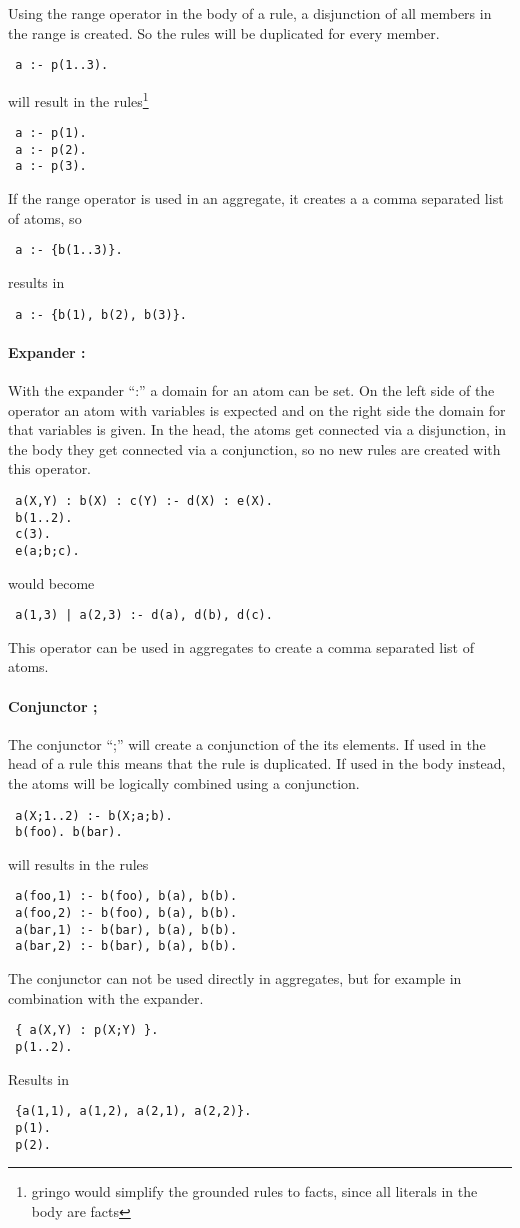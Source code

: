 \documentclass[a4paper,10pt]{article}
\begin{document}
Using the range operator in the body of a rule, a disjunction of all members in the range is created. So the rules will be duplicated for every member.
\begin{verbatim}
 a :- p(1..3).
\end{verbatim}
will result in the rules\footnote{gringo would simplify the grounded rules to facts, since all literals in the body are facts}
\begin{verbatim}
 a :- p(1).
 a :- p(2).
 a :- p(3).
\end{verbatim}
If the range operator is used in an aggregate, it creates a a comma separated list of atoms, so
\begin{verbatim}
 a :- {b(1..3)}.
\end{verbatim}
results in
\begin{verbatim}
 a :- {b(1), b(2), b(3)}.
\end{verbatim}

\paragraph{Expander :}
With the expander ``:'' a domain for an atom can be set.
On the left side of the operator an atom with variables is expected and on the right side the domain for that variables is given.
In the head, the atoms get connected via a disjunction, in the body they get connected via a conjunction, so no new rules are created with this operator.
\begin{verbatim}
 a(X,Y) : b(X) : c(Y) :- d(X) : e(X).
 b(1..2).
 c(3).
 e(a;b;c).
\end{verbatim}
would become
\begin{verbatim}
 a(1,3) | a(2,3) :- d(a), d(b), d(c).
\end{verbatim}
This operator can be used in aggregates to create a comma separated list of atoms.

\paragraph{Conjunctor ;}
The conjunctor ``;'' will create a conjunction of the its elements.
If used in the head of a rule this means that the rule is duplicated.
If used in the body instead, the atoms will be logically combined using a conjunction.
\begin{verbatim}
 a(X;1..2) :- b(X;a;b).
 b(foo). b(bar).
\end{verbatim}
will results in the rules
\begin{verbatim}
 a(foo,1) :- b(foo), b(a), b(b).
 a(foo,2) :- b(foo), b(a), b(b).
 a(bar,1) :- b(bar), b(a), b(b).
 a(bar,2) :- b(bar), b(a), b(b).
\end{verbatim}
The conjunctor can not be used directly in aggregates, but for example in combination with the expander.
\begin{verbatim}
 { a(X,Y) : p(X;Y) }.
 p(1..2).
\end{verbatim}
Results in
\begin{verbatim}
 {a(1,1), a(1,2), a(2,1), a(2,2)}.
 p(1).
 p(2).
\end{verbatim}
\end{document}
